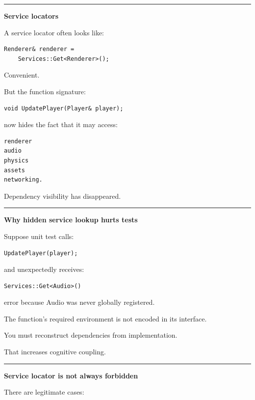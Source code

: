 \begin{center}\rule{0.5\linewidth}{0.5pt}\end{center}

\textbf{Service locators}

A service locator often looks like:

\begin{verbatim}
Renderer& renderer =
    Services::Get<Renderer>();
\end{verbatim}

Convenient.

But the function signature:

\begin{verbatim}
void UpdatePlayer(Player& player);
\end{verbatim}

now hides the fact that it may access:

\begin{verbatim}
renderer
audio
physics
assets
networking.
\end{verbatim}

Dependency visibility has disappeared.

\begin{center}\rule{0.5\linewidth}{0.5pt}\end{center}

\textbf{Why hidden service lookup hurts tests}

Suppose unit test calls:

\begin{verbatim}
UpdatePlayer(player);
\end{verbatim}

and unexpectedly receives:

\begin{verbatim}
Services::Get<Audio>()
\end{verbatim}

error because Audio was never globally registered.

The function's required environment is not encoded in its interface.

You must reconstruct dependencies from implementation.

That increases cognitive coupling.

\begin{center}\rule{0.5\linewidth}{0.5pt}\end{center}

\textbf{Service locator is not always forbidden}

There are legitimate cases:


